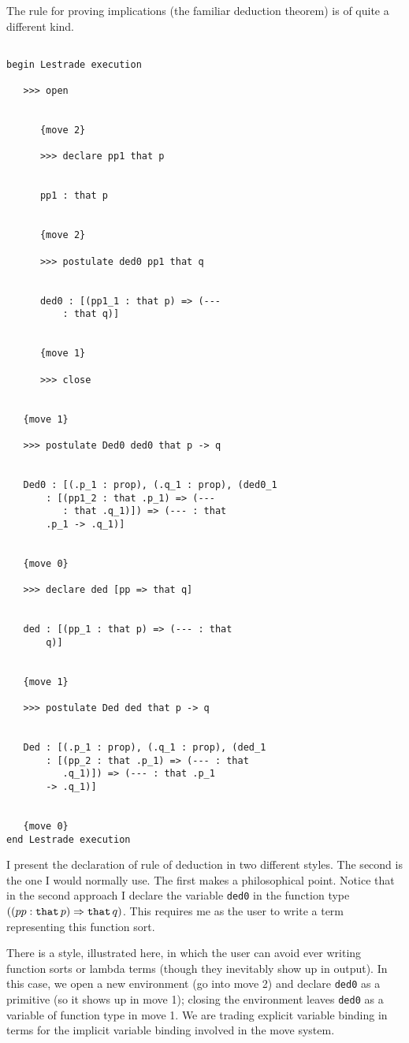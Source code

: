 \documentclass{slides}
\begin{document}
\begin{slide}

The rule for proving implications (the familiar deduction theorem) is of quite a different kind.
{\tiny
\begin{verbatim}

begin Lestrade execution

   >>> open


      {move 2}

      >>> declare pp1 that p


      pp1 : that p


      {move 2}

      >>> postulate ded0 pp1 that q


      ded0 : [(pp1_1 : that p) => (--- 
          : that q)]


      {move 1}

      >>> close


   {move 1}

   >>> postulate Ded0 ded0 that p -> q


   Ded0 : [(.p_1 : prop), (.q_1 : prop), (ded0_1 
       : [(pp1_2 : that .p_1) => (--- 
          : that .q_1)]) => (--- : that 
       .p_1 -> .q_1)]


   {move 0}

   >>> declare ded [pp => that q]


   ded : [(pp_1 : that p) => (--- : that 
       q)]


   {move 1}

   >>> postulate Ded ded that p -> q


   Ded : [(.p_1 : prop), (.q_1 : prop), (ded_1 
       : [(pp_2 : that .p_1) => (--- : that 
          .q_1)]) => (--- : that .p_1 
       -> .q_1)]


   {move 0}
end Lestrade execution

\end{verbatim}
}

\end{slide}

I present the declaration of rule of deduction in two different styles. The second is the one I would normally use.  The first makes a philosophical point.  Notice that in the second
approach I declare the variable {\tt ded0} in the function type $((pp:{\tt that}\,p)\Rightarrow {\tt that}\,q)$.  This requires me as the user to write a term representing this function sort.

There is a style, illustrated here, in which the user can avoid ever writing function sorts or lambda terms (though they inevitably show up in output).  In this case,
we open a new environment (go into move 2) and declare {\tt ded0} as a primitive (so it shows up in move 1);  closing the environment leaves {\tt ded0} as a variable
of function type in move 1.  We are trading explicit variable binding in terms for the implicit variable binding involved in the move system.
\end{document}
